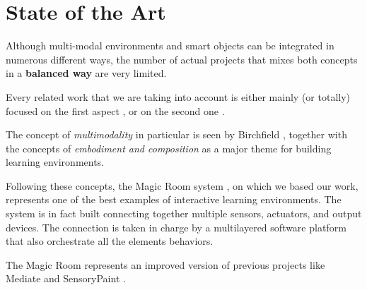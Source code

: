 \chapter{State of the Art}

Although multi-modal environments and smart objects can be integrated in numerous different ways, the number of actual projects that mixes both concepts in a \textbf{balanced way} are very limited. 

Every related work that we are taking into account is either mainly (or totally) focused on the first aspect \cite{mora-guiard_lands_2016}\cite{ringland_sensorypaint:_2014}\cite{pares_promotion_2005}, or on the second one  \cite{yao_rope_2011}.

The concept of \textit{multimodality} in particular is seen by Birchfield \cite{birchfield_embodiment_2008}, together with the concepts of \textit{embodiment and composition} as a major theme for building learning environments. 

Following these concepts, the Magic Room system \cite{garzotto_magic_2018}, on which we based our work, represents one of the best examples of interactive learning environments. The system is in fact built connecting together multiple sensors, actuators, and output devices. 
The connection is taken in charge by a multilayered software platform that also orchestrate all the elements behaviors.

The Magic Room represents an improved version of previous projects like Mediate \cite{pares_promotion_2005} and SensoryPaint \cite{ringland_sensorypaint:_2014}.

